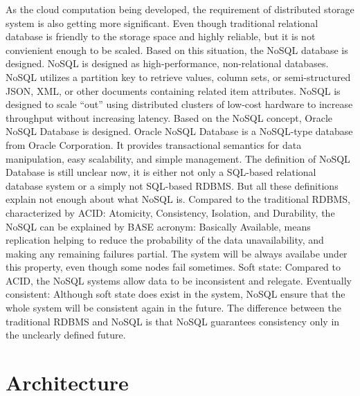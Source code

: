 As the cloud computation being developed, the requirement of distributed storage system is also getting more significant. Even though traditional relational database is friendly to the storage space and highly reliable, but it is not convienient enough to be scaled. Based on this situation, the NoSQL database is designed. 
NoSQL is designed as high-performance, non-relational databases. NoSQL utilizes a partition key to retrieve values, column sets, or semi-structured JSON, XML, or other documents containing related item attributes. NoSQL is designed to scale “out” using distributed clusters of low-cost hardware to increase throughput without increasing latency.
Based on the NoSQL concept, Oracle NoSQL Database is designed. Oracle NoSQL Database is a NoSQL-type database from Oracle Corporation. It provides transactional semantics for data manipulation, easy scalability, and simple management.
The definition of NoSQL Database is still unclear now, it is either not only a SQL-based relational database system or a simply not SQL-based RDBMS. But all these definitions explain not enough about what NoSQL is. Compared to the traditional RDBMS, characterized by ACID: Atomicity, Consistency, Isolation, and Durability, the NoSQL can be explained by BASE acronym:
Basically Available, means replication helping to reduce the probability of the data unavailability, and making any remaining failures partial. The system will be always availabe under this property, even though some nodes fail sometimes.
Soft state: Compared to ACID, the NoSQL systems allow data to be inconsistent and relegate.
Eventually consistent: Although soft state does exist in the system, NoSQL ensure that the whole system will be consistent again in the future. The difference between the traditional RDBMS and NoSQL is that NoSQL guarantees consistency only in the unclearly defined future. 


\section{Architecture}

